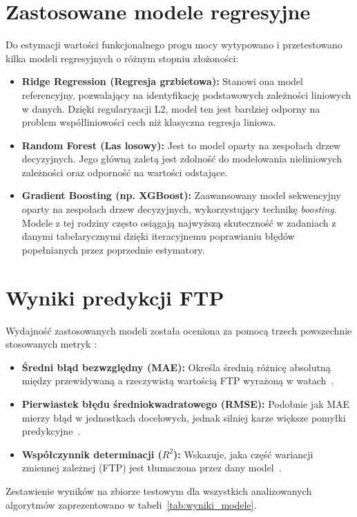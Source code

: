 \section{Zastosowane modele regresyjne}
Do estymacji wartości funkcjonalnego progu mocy wytypowano i przetestowano kilka modeli regresyjnych o różnym stopniu złożoności:
\begin{itemize}
    \item \textbf{Ridge Regression (Regresja grzbietowa):} Stanowi ona model referencyjny, pozwalający na identyfikację podstawowych zależności liniowych w danych. Dzięki regularyzacji L2, model ten jest bardziej odporny na problem współliniowości cech niż klasyczna regresja liniowa.
    \item \textbf{Random Forest (Las losowy):} Jest to model oparty na zespołach drzew decyzyjnych. Jego główną zaletą jest zdolność do modelowania nieliniowych zależności oraz odporność na wartości odstające.
    \item \textbf{Gradient Boosting (np. XGBoost):} Zaawansowany model sekwencyjny oparty na zespołach drzew decyzyjnych, wykorzystujący technikę \textit{boosting}. Modele z tej rodziny często osiągają najwyższą skuteczność w zadaniach z danymi tabelarycznymi dzięki iteracyjnemu poprawianiu błędów popełnianych przez poprzednie estymatory.
\end{itemize}

\section{Wyniki predykcji FTP}
Wydajność zastosowanych modeli została oceniona za pomocą trzech powszechnie stosowanych metryk \cite{scikit_model_evaluation}:
\begin{itemize}
    \item \textbf{Średni błąd bezwzględny (MAE):} Określa średnią różnicę absolutną między przewidywaną a rzeczywistą wartością FTP wyrażoną w watach~\cite{scikit_mae}.
    \item \textbf{Pierwiastek błędu średniokwadratowego (RMSE):} Podobnie jak MAE mierzy błąd w jednostkach docelowych, jednak silniej karze większe pomyłki predykcyjne~\cite{scikit_mse}.
    \item \textbf{Współczynnik determinacji ($R^2$):} Wskazuje, jaka część wariancji zmiennej zależnej (FTP) jest tłumaczona przez dany model~\cite{scikit_r2}.
\end{itemize}

Zestawienie wyników na zbiorze testowym dla wszystkich analizowanych algorytmów zaprezentowano w tabeli~\ref{tab:wyniki_modele}.

